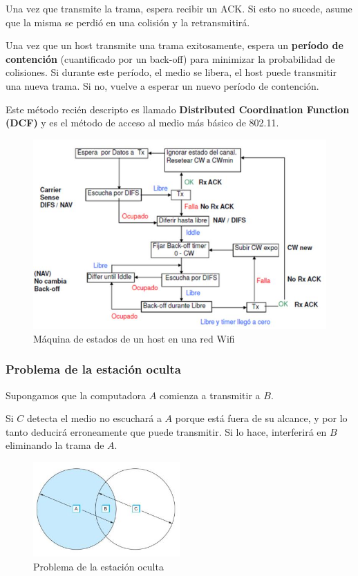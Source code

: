 Una vez que transmite la trama, espera recibir un ACK. Si esto no sucede, asume que la misma se perdió en una colisión y la retransmitirá. 

Una vez que un host transmite una trama exitosamente, espera un \textbf{período de contención} (cuantificado por un back-off) para minimizar la probabilidad de colisiones. Si durante este período, el medio se libera, el host puede transmitir una nueva trama. Si no, vuelve a esperar un nuevo período de contención.

Este método recién descripto es llamado \textbf{Distributed Coordination Function (DCF)} y es el método de acceso al medio más básico de 802.11.

\begin{figure}[H]
	\centering
	\includegraphics[width=\textwidth
]{images/wifi-estados.jpg}
	\caption[Máquina de estados de un host en una red Wifi]{Máquina de estados de un host en una red Wifi}
	\label{fig:wifi-estados}
\end{figure}

\subsubsection{Problema de la estación oculta}
Supongamos que la computadora \(A\) comienza a transmitir a \(B\). 

Si \(C\) detecta el medio no escuchará a \(A\) porque está fuera de su alcance, y por lo tanto deducirá erroneamente que puede transmitir. Si lo hace, interferirá en \(B\) eliminando la trama de \(A\).

\begin{figure}[H]
	\centering
	\includegraphics[width=0.5\textwidth
]{images/estacion-oculta.jpg}
	\caption[Problema de la estación oculta]{Problema de la estación oculta}
	\label{fig:estacion-oculta}
\end{figure}

